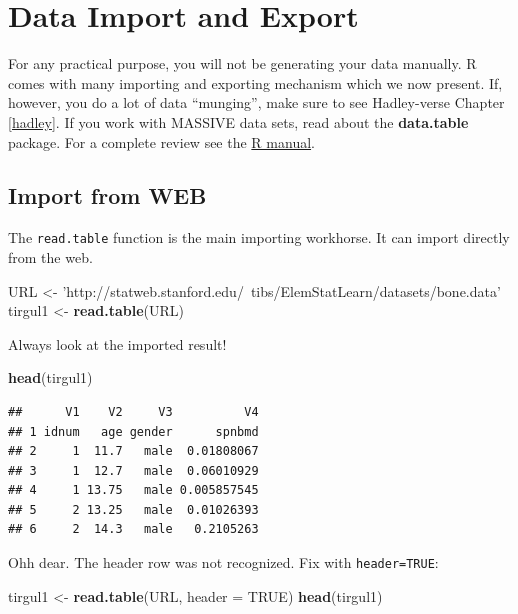 \documentclass[]{book}
\newenvironment{Shaded}{\begin{snugshade}}{\end{snugshade}}
\newcommand{\KeywordTok}[1]{\textcolor[rgb]{0.13,0.29,0.53}{\textbf{{#1}}}}
\newcommand{\DataTypeTok}[1]{\textcolor[rgb]{0.13,0.29,0.53}{{#1}}}
\newcommand{\StringTok}[1]{\textcolor[rgb]{0.31,0.60,0.02}{{#1}}}
\newcommand{\OtherTok}[1]{\textcolor[rgb]{0.56,0.35,0.01}{{#1}}}
\newcommand{\NormalTok}[1]{{#1}}
\theoremstyle{definition}
\theoremstyle{definition}
\theoremstyle{remark}
\begin{document}
\section{Data Import and Export}\label{data-import-and-export}

For any practical purpose, you will not be generating your data
manually. R comes with many importing and exporting mechanism which we
now present. If, however, you do a lot of data ``munging'', make sure to
see Hadley-verse Chapter \ref{hadley}. If you work with MASSIVE data
sets, read about the \textbf{data.table} package. For a complete review
see the \href{http://cran.r-project.org/doc/manuals/R-data.html}{R
manual}.

\subsection{Import from WEB}\label{import-from-web}

The \texttt{read.table} function is the main importing workhorse. It can
import directly from the web.

\begin{Shaded}
\begin{Highlighting}[]
\NormalTok{URL <-}\StringTok{ 'http://statweb.stanford.edu/~tibs/ElemStatLearn/datasets/bone.data'}
\NormalTok{tirgul1 <-}\StringTok{ }\KeywordTok{read.table}\NormalTok{(URL)}
\end{Highlighting}
\end{Shaded}

Always look at the imported result!

\begin{Shaded}
\begin{Highlighting}[]
\KeywordTok{head}\NormalTok{(tirgul1)}
\end{Highlighting}
\end{Shaded}

\begin{verbatim}
##      V1    V2     V3          V4
## 1 idnum   age gender      spnbmd
## 2     1  11.7   male  0.01808067
## 3     1  12.7   male  0.06010929
## 4     1 13.75   male 0.005857545
## 5     2 13.25   male  0.01026393
## 6     2  14.3   male   0.2105263
\end{verbatim}

Ohh dear. The header row was not recognized. Fix with
\texttt{header=TRUE}:

\begin{Shaded}
\begin{Highlighting}[]
\NormalTok{tirgul1 <-}\StringTok{ }\KeywordTok{read.table}\NormalTok{(URL, }\DataTypeTok{header =} \OtherTok{TRUE}\NormalTok{) }
\KeywordTok{head}\NormalTok{(tirgul1)}
\end{Highlighting}
\end{Shaded}
\end{document}
